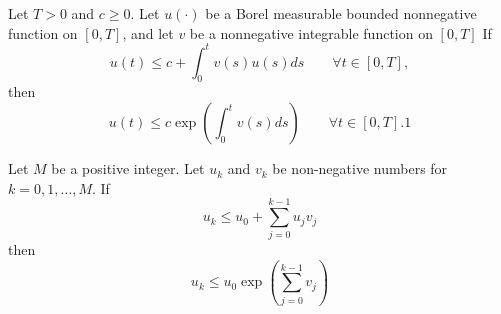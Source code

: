 \begin{thm}\label{thm:Gronwall}
	Let $T > 0$ and $c \geq 0$. Let $u(·)$ be a Borel measurable bounded nonnegative function on 
	$[0,T]$, and let $v$ be a nonnegative integrable function on $[0,T]$
	If
	$$
		u(t) \leq c 
			+\int_{0}^{t} v(s)u(s)ds \qquad \forall t \in [0,T],
	$$
	then
	$$
	u(t) \leq c\exp
		\left(
			\int_{0}^{t} v(s)ds 
		\right)
		\qquad \forall t \in [0,T].1
	$$
	
\end{thm}

\begin{thm}\label{thm:DiscreteGrongall}
	Let $M$ be a positive integer. Let $u_k$ and $v_k$ be non-negative numbers for $k=0,1,\dots,M$. 
	If
	$$
		u_k\leq u_0 + \sum_{j=0}^{k-1} u_j v_j
	$$
	then
	\begin{equation}
		u_k \leq u_0 
		\exp
		\left(
		\sum_{j=0}^{k-1}v_j
		\right)
	\end{equation}
		
\end{thm}
